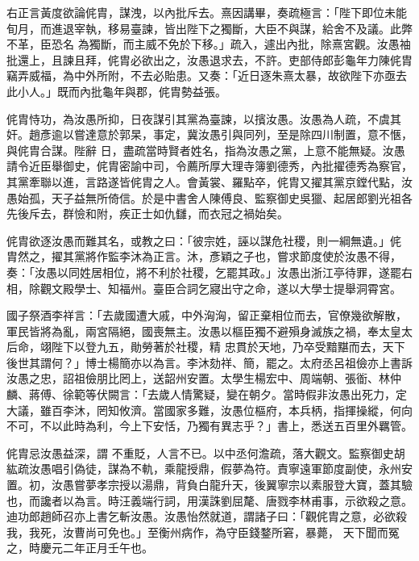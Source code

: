 \begin{pinyinscope}
 右正言黃度欲論侂胄，謀洩，以內批斥去。熹因講畢，奏疏極言：「陛下即位未能旬月，而進退宰執，移易臺諫，皆出陛下之獨斷，大臣不與謀，給舍不及議。此弊不革，臣恐名
 為獨斷，而主威不免於下移。」疏入，遽出內批，除熹宮觀。汝愚袖批還上，且諫且拜，侂胄必欲出之，汝愚退求去，不許。吏部侍郎彭龜年力陳侂胄竊弄威福，為中外所附，不去必貽患。又奏：「近日逐朱熹太暴，故欲陛下亦亟去此小人。」既而內批龜年與郡，侂胄勢益張。



 侂胄恃功，為汝愚所抑，日夜謀引其黨為臺諫，以擯汝愚。汝愚為人疏，不虞其奸。趙彥逾以嘗達意於郭杲，事定，冀汝愚引與同列，至是除四川制置，意不愜，與侂胄合謀。陛辭
 日，盡疏當時賢者姓名，指為汝愚之黨，上意不能無疑。汝愚請令近臣舉御史，侂胄密諭中司，令薦所厚大理寺簿劉德秀，內批擢德秀為察官，其黨牽聯以進，言路遂皆侂胄之人。會黃裳、羅點卒，侂胄又擢其黨京鏜代點，汝愚始孤，天子益無所倚信。於是中書舍人陳傅良、監察御史吳獵、起居郎劉光祖各先後斥去，群憸和附，疾正士如仇讎，而衣冠之禍始矣。



 侂胄欲逐汝愚而難其名，或教之曰：「彼宗姓，誣以謀危社稷，則一綱無遺。」侂
 胄然之，擢其黨將作監李沐為正言。沐，彥穎之子也，嘗求節度使於汝愚不得，奏：「汝愚以同姓居相位，將不利於社稷，乞罷其政。」汝愚出浙江亭待罪，遂罷右相，除觀文殿學士、知福州。臺臣合詞乞寢出守之命，遂以大學士提舉洞霄宮。



 國子祭酒李祥言：「去歲國遭大戚，中外洶洶，留正棄相位而去，官僚幾欲解散，軍民皆將為亂，兩宮隔絕，國喪無主。汝愚以樞臣獨不避殞身滅族之禍，奉太皇太后命，翊陛下以登九五，勛勞著於社稷，精
 忠貫於天地，乃卒受黯黮而去，天下後世其謂何？」博士楊簡亦以為言。李沐劾祥、簡，罷之。太府丞呂祖儉亦上書訴汝愚之忠，詔祖儉朋比罔上，送韶州安置。太學生楊宏中、周端朝、張衜、林仲麟、蔣傅、徐範等伏闕言：「去歲人情驚疑，變在朝夕。當時假非汝愚出死力，定大議，雖百李沐，罔知攸濟。當國家多難，汝愚位樞府，本兵柄，指揮操縱，何向不可，不以此時為利，今上下安恬，乃獨有異志乎？」書上，悉送五百里外羈管。



 侂胄忌汝愚益深，謂
 不重貶，人言不已。以中丞何澹疏，落大觀文。監察御史胡紘疏汝愚唱引偽徒，謀為不軌，乘龍授鼎，假夢為符。責寧遠軍節度副使，永州安置。初，汝愚嘗夢孝宗授以湯鼎，背負白龍升天，後翼寧宗以素服登大寶，蓋其驗也，而讒者以為言。時汪義端行詞，用漢誅劉屈氂、唐戮李林甫事，示欲殺之意。迪功郎趙師召亦上書乞斬汝愚。汝愚怡然就道，謂諸子曰：「觀侂胄之意，必欲殺我，我死，汝曹尚可免也。」至衡州病作，為守臣錢鍪所窘，暴薨，
 天下聞而冤之，時慶元二年正月壬午也。




\end{pinyinscope}
